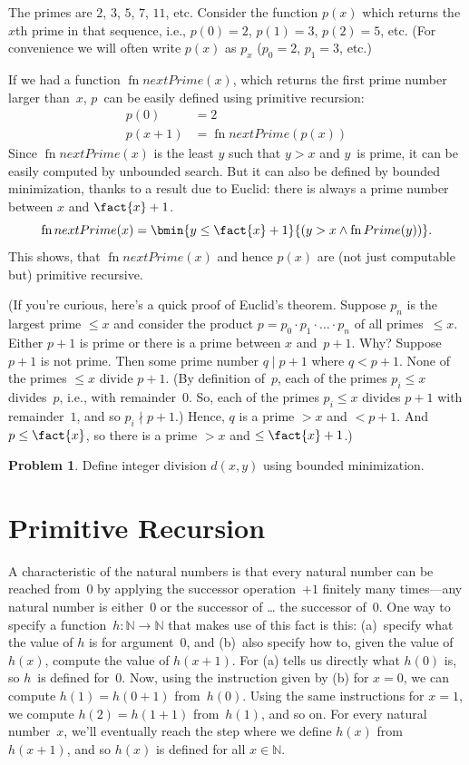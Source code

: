 \documentclass[10pt,a4paper]{article}
\theoremstyle{plain}
\theoremstyle{definition}
\newtheorem{prob}{Problem}[section]
\theoremstyle{remark}
\newcommand*{\olfileid}[3]{}
\newcommand*{\olsection}[1]{\section*{#1}}
\providecommand{\Nat}{\ensuremath{\mathbb{N}}}
\providecommand{\fn}{\operatorname{fn}}
\begin{document}
The primes are $2$, $3$, $5$, $7$, $11$, etc. Consider the function
$p(x)$ which returns the $x$th prime in that sequence, i.e., $p(0) =
2$, $p(1) = 3$, $p(2) = 5$, etc. (For convenience we will often write
$p(x)$ as $p_x$ ($p_0=2$, $p_1=3$, etc.)

If we had a function
$\fn{nextPrime(x)}$, which returns the first prime number larger
than~$x$, $p$~can be easily defined using primitive recursion:
\begin{align*}
  p(0) & = 2\\
  p(x+1) & = \fn{nextPrime}(p(x))
\end{align*}
Since $\fn{nextPrime}(x)$ is the least $y$ such that $y > x$ and
$y$~is prime, it can be easily computed by unbounded search. But it
can also be defined by bounded minimization, thanks to a result due to
Euclid: there is always a prime number between $x$ and $\fact{x}+1$.
\[
  \fn{nextPrime(x)} =
  \bmin{y \leq \fact{x}+1}{(y > x \land \fn{Prime}(y))}.
\]
This shows, that $\fn{nextPrime}(x)$ and hence $p(x)$ are (not just
computable but) primitive recursive.

(If you're curious, here's a quick proof of Euclid's theorem. Suppose
$p_n$ is the largest prime $\le x$ and consider the product $p =
p_0\cdot p_1 \cdot \dots \cdot p_n$ of all primes~$\le x$. Either
$p+1$ is prime or there is a prime between $x$ and~$p+1$.  Why?
Suppose $p+1$ is not prime. Then some prime number $q \mid p+1$ where
$q < p+1$. None of the primes $\le x$ divide $p+1$. (By definition
of~$p$, each of the primes $p_i \le x$ divides~$p$, i.e., with
remainder~$0$. So, each of the primes $p_i \le x$ divides $p+1$ with
remainder~$1$, and so $p_i \nmid p+1$.)  Hence, $q$ is a prime $>
x$ and $< p+1$.  And $p \le \fact{x}$, so there is a prime $> x$ and $\le
\fact{x}+1$.)

\begin{prob}
Define integer division $d(x, y)$ using bounded minimization.
\end{prob}





\olfileid{cmp}{rec}{pre}
\olsection{Primitive Recursion}

A characteristic of the natural numbers is that every natural number
can be reached from~$0$ by applying the successor operation~$+1$
finitely many times---any natural number is either~$0$ or the
successor of \dots{} the successor of~$0$. One way to specify a
function~$h\colon\Nat \to \Nat$ that makes use of this fact is this:
(a)~specify what the value of $h$ is for argument~$0$, and (b)~also
specify how to, given the value of $h(x)$, compute the value of
$h(x+1)$. For (a) tells us directly what $h(0)$ is, so $h$~is defined
for~$0$. Now, using the instruction given by (b) for $x=0$, we can
compute $h(1) = h(0+1)$ from~$h(0)$. Using the same instructions for
$x=1$, we compute $h(2) = h(1+1)$ from~$h(1)$, and so on. For every
natural number~$x$, we'll eventually reach the step where we define
$h(x)$ from $h(x+1)$, and so $h(x)$ is defined for all $x \in \Nat$.
\end{document}
